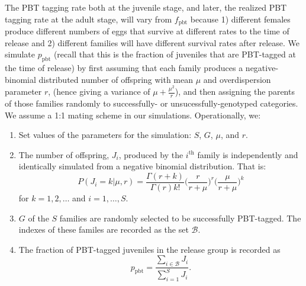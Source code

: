 \documentclass[11pt]{article}
\newcommand{\thh}{^\mathrm{th}}
\begin{document}
The PBT tagging rate both at the juvenile stage, and later, the realized PBT tagging rate at the adult stage,
will vary from $f_\mathrm{pbt}$ because 1) different females produce different
numbers of eggs that survive at different rates to the time of release and 2) different families
will have different survival rates after release.  We simulate $p_\mathrm{pbt}$ (recall that this is
the fraction of juveniles that are PBT-tagged at the time of release)
by first assuming that each
family produces a negative-binomial distributed number of offspring with mean $\mu$ and 
overdispersion parameter $r$, (hence giving a variance of $\mu + \frac{\mu^2}{r}$), and then
assigning the parents of those families randomly to successfully- or unsucessfully-genotyped
categories.  We assume a 1:1 mating scheme in our simulations.  Operationally, we:
\begin{enumerate}
\item Set values of the parameters for the simulation: $S$, $G$, $\mu$, and $r$.
\item The number of offspring, $J_i$, produced by the $i\thh$ family is independently and identically simulated 
from a negative binomial distribution.  That is:
\[
P(J_i = k | \mu, r) = \frac{\Gamma(r + k)}{\Gamma(r)k!}\biggl(\frac{r}{r+\mu}\biggr)^r 
\biggl(\frac{\mu}{r+\mu}\biggr)^k
\] 
for $k = 1, 2, \ldots$ and $i = 1,\ldots, S$.  
\item $G$ of the $S$ families are randomly selected to be successfully PBT-tagged. The
indexes of these familes are recorded as the set
$\mathcal{B}$.  
\item The fraction of PBT-tagged juveniles in the release group is recorded as
\[
p_\mathrm{pbt} = \frac{\sum_{i\in\mathcal{B}} J_i}{\sum_{i=1}^S J_i}.
\]
\end{enumerate}
 
\end{document}
